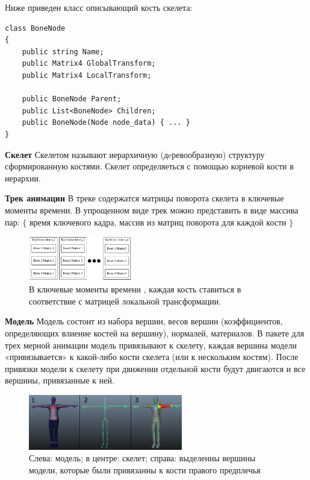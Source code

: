 Ниже приведен класс описывающий кость скелета:
\begin{small}
\begin{verbatim}
class BoneNode
{
    public string Name;
    public Matrix4 GlobalTransform;
    public Matrix4 LocalTransform;

    public BoneNode Parent;
    public List<BoneNode> Children;
    public BoneNode(Node node_data) { ... }
}
\end{verbatim}
\end{small}

\textbf{Скелет}
Скелетом называют иерархичную (дeревообразную) структуру сформированную костями. Скелет определяеться с помощью корневой кости в иерархии.


\textbf{Трек анимации}
В треке содержатся матрицы поворота скелета в ключевые моменты времени.
В упрощенном виде трек можно представить в виде  массива пар: 
$\lbrace$ время ключевого кадра, массив из матриц поворота для каждой кости $\rbrace$

\begin{figure}[h!]
    \centering
    \includegraphics[width=0.4\textwidth]{anim_track.png}
    \caption{\small{В ключевые моменты времени , каждая кость ставиться в соответствие с матрицей локальной трансформации.}}
    
\end{figure}


\textbf{Модель}
Модель состоит из набора вершин, весов вершин (коэффициентов, определяющих влиение костей на вершину), нормалей, материалов. В пакете для трех мерной анимации модель привязывают к скелету, каждая вершина модели «привязывается» к какой-либо кости скелета (или к нескольким костям). После привязки модели к скелету при движении отдельной кости будут двигаются и все вершины, привязанные к ней.

\begin{figure}[h!]
    \centering
    \includegraphics[width=0.6\textwidth]{skinning.png}
    \caption{\small{Слева: модель; в центре: скелет; справа: выделенны вершины модели, которые были привязанны к кости правого предплечья}}
\end{figure}

